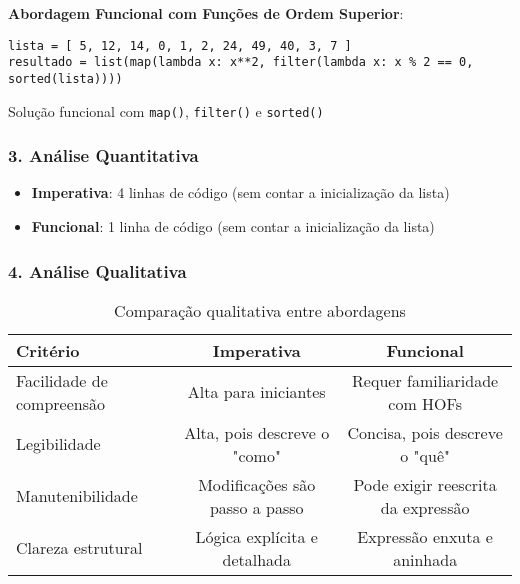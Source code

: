 \documentclass{article}
\begin{document}
\textbf{Abordagem Funcional com Funções de Ordem Superior}:

\begin{listing}[!ht]
\begin{verbatim}
lista = [ 5, 12, 14, 0, 1, 2, 24, 49, 40, 3, 7 ]
resultado = list(map(lambda x: x**2, filter(lambda x: x % 2 == 0, sorted(lista))))
\end{verbatim}
\caption{Solução funcional com \texttt{map()}, \texttt{filter()} e \texttt{sorted()}}
\label{listing:hof_funcional}
\end{listing}

\subsubsection*{3. Análise Quantitativa}

\begin{itemize}
    \item \textbf{Imperativa}: 4 linhas de código (sem contar a inicialização da lista)
    \item \textbf{Funcional}: 1 linha de código (sem contar a inicialização da lista)
\end{itemize}

\subsubsection*{4. Análise Qualitativa}

\begin{table}[H]
\centering
\caption{Comparação qualitativa entre abordagens}
\begin{tabular}{|l|c|c|}
\hline
\textbf{Critério} & \textbf{Imperativa} & \textbf{Funcional} \\
\hline
Facilidade de compreensão & Alta para iniciantes & Requer familiaridade com HOFs \\
\hline
Legibilidade & Alta, pois descreve o "como" & Concisa, pois descreve o "quê" \\
\hline
Manutenibilidade & Modificações são passo a passo & Pode exigir reescrita da expressão \\
\hline
Clareza estrutural & Lógica explícita e detalhada & Expressão enxuta e aninhada \\
\hline
\end{tabular}
\end{table}
\end{document}
